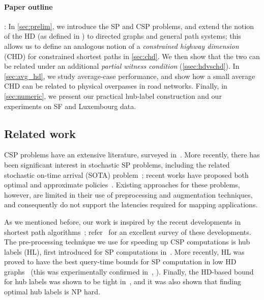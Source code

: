\paragraph{Paper outline}:
In \cref{sec:prelim}, we introduce the SP and CSP problems, and extend the notion of the HD (as defined in \citep{hd_journal}) to directed graphs and general path systems; this allows us to define an analogous notion of a \emph{constrained highway dimension} (CHD) for constrained shortest paths in \cref{sec:chd}. 
We then show that the two can be related under an additional \emph{partial witness condition} (\cref{ssec:hdvschd}). 
In \cref{sec:avg_hd}, we study average-case performance, and show how a small average CHD can be related to physical overpasses in road networks. 
Finally, in \cref{sec:numeric}, we present our practical hub-label construction and our experiments on SF and Luxembourg data.


\subsection{Related work}

CSP problems have an extensive literature, surveyed in~\citep{csp_survey}. 
More recently, there has been significant interest in stochastic SP problems, including the related stochastic on-time arrival (SOTA) problem~\citep{fan2005arriving}; recent works have proposed both optimal and approximate policies~\citep{sabran2014precomputation,nikolova_discretization}. 
Existing approaches for these problems, however, are limited in their use of preprocessing and augmentation techniques, and consequently do not support the latencies required for mapping applications.

As we mentioned before, our work is inspired by the recent developments in shortest path algorithms~\citep{hd_journal,hubimplem,highway2010,dimacs09,geisberger_ch_definition,skeleton}; refer~\citep{goldberg_survey} for an excellent survey of these developments. 
The pre-processing technique we use for speeding up CSP computations is hub labels (HL), first introduced for SP computations in~\citep{cohen_definition_hl}. 
More recently, HL was proved to have the best query-time bounds for SP computation in low HD graphs~\citep{hd_journal,highway2010} (this was experimentally confirmed in~\citep{hubimplem}, \cite[Figure 7]{goldberg_survey}).  
Finally, the HD-based bound for hub labels was shown to be tight in~\citep{babenko_hl_complexity,white_complexity_hd}, and it was also shown that finding optimal hub labels is NP hard.

